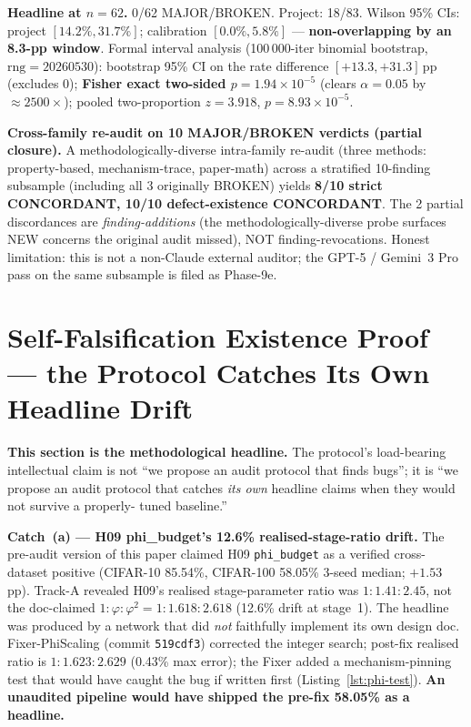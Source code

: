 \documentclass{article}
\begin{document}
\textbf{Headline at $n{=}62$.} 0/62 MAJOR/BROKEN. Project: 18/83.
Wilson 95\% CIs: project $[14.2\%, 31.7\%]$; calibration
$[0.0\%, 5.8\%]$ --- \textbf{non-overlapping by an 8.3-pp window}.
Formal interval analysis (100\,000-iter binomial bootstrap,
$\mathrm{rng}=20260530$): bootstrap 95\% CI on the rate difference
$[+13.3, +31.3]$\,pp (excludes 0); \textbf{Fisher exact two-sided
$p = 1.94 \times 10^{-5}$} (clears $\alpha{=}0.05$ by
$\approx 2500\times$); pooled two-proportion $z = 3.918$,
$p = 8.93 \times 10^{-5}$.

\textbf{Cross-family re-audit on 10 MAJOR/BROKEN verdicts (partial closure).}
A methodologically-diverse intra-family re-audit (three methods:
property-based, mechanism-trace, paper-math) across a stratified
10-finding subsample (including all 3 originally BROKEN) yields
\textbf{8/10 strict CONCORDANT, 10/10 defect-existence CONCORDANT}.
The 2 partial discordances are \emph{finding-additions} (the
methodologically-diverse probe surfaces NEW concerns the original
audit missed), NOT finding-revocations. Honest limitation: this is not
a non-Claude external auditor; the GPT-5 / Gemini~3 Pro pass on the
same subsample is filed as Phase-9e.

\section{Self-Falsification Existence Proof --- the Protocol Catches Its Own Headline Drift}
\label{sec:self-falsification}

\textbf{This section is the methodological headline.} The protocol's
load-bearing intellectual claim is not ``we propose an audit protocol
that finds bugs''; it is ``we propose an audit protocol that catches
\emph{its own} headline claims when they would not survive a properly-
tuned baseline.''

\textbf{Catch~(a) --- H09 phi\_budget's 12.6\% realised-stage-ratio
drift.} The pre-audit version of this paper claimed H09
\texttt{phi\_budget} as a verified cross-dataset positive
(CIFAR-10 85.54\%, CIFAR-100 58.05\% 3-seed median;
$+1.53$\,pp). Track-A revealed H09's realised stage-parameter ratio
was $1{:}1.41{:}2.45$, not the doc-claimed
$1{:}\varphi{:}\varphi^2 = 1{:}1.618{:}2.618$ (12.6\% drift at
stage~1). The headline was produced by a network that did \emph{not}
faithfully implement its own design doc. Fixer-PhiScaling (commit
\texttt{519cdf3}) corrected the integer search; post-fix realised
ratio is $1{:}1.623{:}2.629$ (0.43\% max error); the Fixer added a
mechanism-pinning test that would have caught the bug if written first
(Listing~\ref{lst:phi-test}). \textbf{An unaudited pipeline would have
shipped the pre-fix 58.05\% as a headline.}
\end{document}
